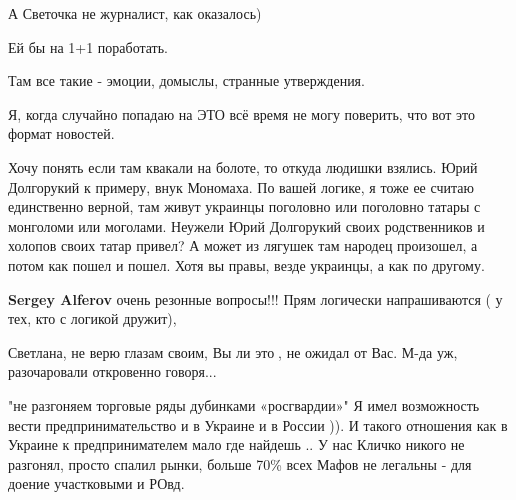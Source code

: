 \begin{itemize}
\begin{itemize}
А Светочка не журналист, как оказалось)

Ей бы на 1+1 поработать.

Там все такие - эмоции, домыслы, странные утверждения.

Я, когда случайно попадаю на ЭТО всё время не могу поверить, что вот это формат
новостей.

\end{itemize}

 

Хочу понять если там квакали на болоте, то откуда людишки взялись. Юрий
Долгорукий к примеру, внук Мономаха. По вашей логике, я тоже ее считаю
единственно верной, там живут украинцы поголовно или поголовно татары с
монголоми или моголами. Неужели Юрий Долгорукий своих родственников и холопов
своих татар привел? А может из лягушек там народец произошел, а потом как пошел
и пошел. Хотя вы правы, везде украинцы, а как по другому.

\begin{itemize}
 
\textbf{Sergey Alferov} очень резонные вопросы!!! Прям логически напрашиваются ( у тех, кто с логикой дружит),
\end{itemize}

 
Светлана, не верю глазам своим, Вы ли это🤔, не ожидал от Вас. М-да уж, разочаровали откровенно говоря...

 

"не разгоняем торговые ряды дубинками «росгвардии»" Я имел возможность вести
предпринимательство и в Украине и в России )). И такого отношения как в Украине
к предпринимателем мало где найдешь .. У нас Кличко никого не разгонял, просто
спалил рынки, больше 70\% всех Мафов не легальны - для доение участковыми и
РОвд. 


\end{itemize}

